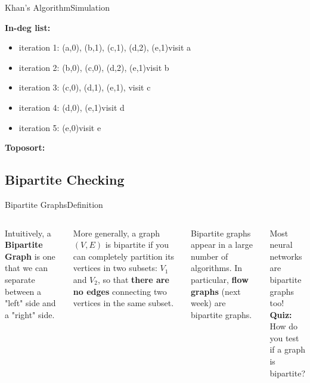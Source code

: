 \begin{frame}{Khan's Algorithm}{Simulation}
  \begin{center}
    
  \end{center}
  {\bf In-deg list:}
  \begin{itemize}
    \item<2-> iteration 1: (a,0), (b,1), (c,1), (d,2), (e,1)\hfill visit a
    \item<3-> iteration 2: (b,0), (c,0), (d,2), (e,1)\hfill visit b
    \item<4-> iteration 3: (c,0), (d,1), (e,1), \hfill visit c
    \item<5-> iteration 4: (d,0), (e,1)\hfill visit d
    \item<6-> iteration 5: (e,0)\hfill visit e
  \end{itemize}
  {\bf Toposort:     }
\end{frame}

%
%
%

\subsection{Bipartite Checking}
\begin{frame}{Bipartite Graphs}{Definition}
  \begin{columns}
      Intuitively, a {\bf Bipartite Graph} is one that we can separate between a "left" side and a "right" side.\bigskip

      More generally, a graph $(V,E)$ is bipartite if you can completely partition its vertices in two subsets: $V_1$ and $V_2$, so that {\bf there are no edges} connecting two vertices in the same subset.\bigskip

      Bipartite graphs appear in a large number of algorithms. In particular, {\bf flow graphs} (next week) are bipartite graphs.\bigskip

      Most neural networks are bipartite graphs too!\\
      {\bf Quiz:} How do you test if a graph is bipartite?
    
  \end{columns}
\end{frame}

